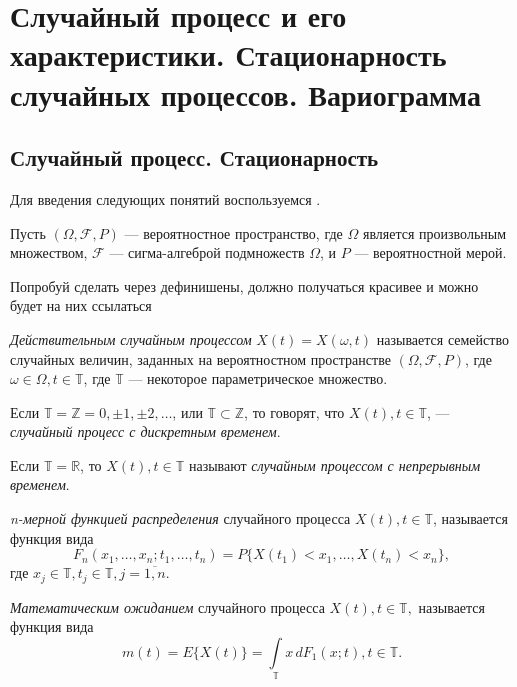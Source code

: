 \newpage
\chapter{Случайный процесс и его характеристики. Стационарность случайных процессов. Вариограмма}
\label{c:definitions}

\section{Случайный процесс. Стационарность}

Для введения следующих понятий воспользуемся \cite{brillinjer-ts, trush-ts}.

Пусть $ (\Omega, \mathcal{F}, P) $ --- вероятностное пространство, где $\Omega$ является произвольным множеством, $\mathcal{F}$ --- сигма-алгеброй подмножеств $\Omega$, и $P$ --- вероятностной мерой.

\begin{Definition}\label{def:stochasticProcess}
Попробуй сделать через дефинишены, должно получаться красивее и можно будет на них ссылаться
\end{Definition}

\textit{Действительным случайным процессом} $ X(t) = X(\omega, t) $ называется семейство случайных величин, заданных на вероятностном пространстве $ (\Omega, \mathcal{F}, P) $, где $ \omega \in \Omega, t \in \mathbb{T}$, где $ \mathbb{T} $ --- некоторое параметрическое множество.

Если $ \mathbb{T} = \mathbb{Z} = {0, \pm 1, \pm 2, \dots} $, или $ \mathbb{T} \subset \mathbb{Z} $, то говорят, что $ X(t), t \in \mathbb{T} $, --- \textit{случайный процесс с дискретным временем}.

Если $ \mathbb{T} = \mathbb{R} $, то $ X(t), t \in \mathbb{T} $ называют \textit{случайным процессом с непрерывным временем}.

\textit{n-мерной функцией распределения} случайного процесса $ X(t), t \in \mathbb{T} $, называется функция вида
\begin{equation*}
	F_n(x_1, \dots, x_n; t_1, \dots, t_n) = P \{ X(t_1) < x_1, \dots, X(t_n) < x_n \},
\end{equation*}
где $ x_j \in \mathbb{T}, t_j \in \mathbb{T}, j = \overline{1,n} $.

\textit{Математическим ожиданием} случайного процесса $ X(t), t \in \mathbb{T}, $ называется функция вида
\begin{equation*}
	m(t) = E \{ X(t) \} = \int \limits_{\mathbb{T}} x \, dF_1(x;t), t \in \mathbb{T}.
\end{equation*}

